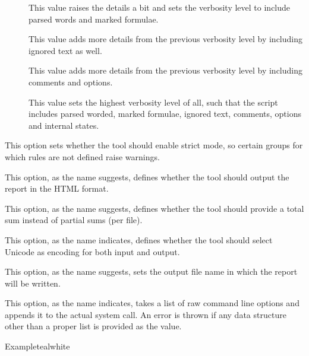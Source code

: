 \begin{description}
\begin{description}
\begin{description}
\item[] This value raises the details a bit and sets the verbosity level to include parsed words and marked formulae.

\item[] This value adds more details from the previous verbosity level by including ignored text as well.

\item[] This value adds more details from the previous verbosity level by including comments and options.

\item[] This value sets the highest verbosity level of all, such that the script includes parsed worded, marked formulae, ignored text, comments, options and internal states.
\end{description}

\item[\rpsbox{strict}] This option sets whether the tool should enable strict mode, so certain groups for which rules are not defined raise warnings.

\item[\rpsbox{html}] This option, as the name suggests, defines whether the tool should output the report in the HTML format.

\item[\rpsbox{total}] This option, as the name suggests, defines whether the tool should provide a total sum instead of partial sums (per file).

\item[\rpsbox{unicode}] This option, as the name indicates, defines whether the tool should select Unicode as encoding for both input and output.

\item[\abox{output}] This option, as the name suggests, sets the output file name in which the report will be written.

\item[\abox{options}] This option, as the name indicates, takes a list of raw command line options and appends it to the actual system call. An error is thrown if any data structure other than a proper list is provided as the value.
\end{description}

\begin{codebox}{Example}{teal}{\icnote}{white}
\end{codebox}


\end{description}
